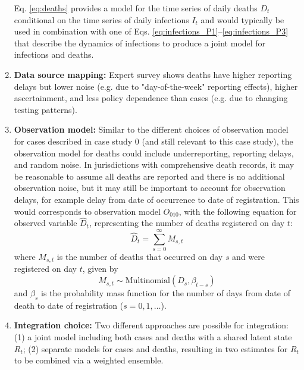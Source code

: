 \documentclass{article}
\begin{document}
\begin{enumerate}
    Eq. \eqref{eq:deaths} provides a model for the time series of daily deaths $D_t$ conditional on the time series of daily infections $I_t$ and would typically be used in combination with one of Eqs. \eqref{eq:infections_P1}--\eqref{eq:infections_P3} that describe the dynamics of infections to produce a joint model for infections and deaths. 
    \item \textbf{Data source mapping:} Expert survey shows deaths have higher reporting delays but lower noise (e.g. due to "day-of-the-week" reporting effects), higher ascertainment, and less policy dependence than cases (e.g. due to changing testing patterns).
    \item \textbf{Observation model:} Similar to the different choices of observation model for cases described in case study 0 (and still relevant to this case study), the observation model for deaths could include underreporting, reporting delays, and random noise. In jurisdictions with comprehensive death records, it may be reasonable to assume all deaths are reported and there is no additional observation noise, but it may still be important to account for observation delays, for example delay from date of occurrence to date of registration. 
    This would corresponds to observation model $O_{010}$, with the following equation for observed variable $\hat{D}_t$, representing the number of deaths registered on day $t$:
\begin{equation}
    \hat{D}_t = \sum_{s=0}^\infty M_{s,t}
\end{equation}
where $M_{s,t}$ is the number of deaths that occurred on day $s$ and were registered on day $t$, given by
\begin{equation}
    M_{s,t} \sim \mathrm{Multinomial}\left( D_s, \beta_{t-s}\right) 
\end{equation}
and $\beta_s$ is the probability mass function for the number of days from date of death to date of registration ($s=0,1,\ldots$).
    
    \item \textbf{Integration choice:} 
       Two different approaches are possible for integration: (1) a joint model including both cases and deaths with a shared latent state $R_t$; (2) separate models for cases and deaths, resulting in two estimates for $R_t$ to be combined via a weighted ensemble. 
       

\end{enumerate}
\end{document}
